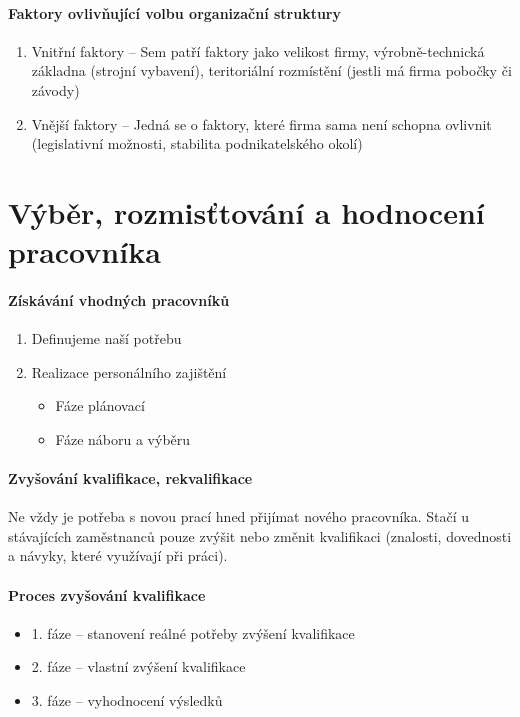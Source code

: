 \paragraph*{Faktory ovlivňující volbu organizační struktury}
\begin{enumerate}
   \item Vnitřní faktory -- Sem patří faktory jako velikost firmy, výrobně-technická základna (strojní vybavení), teritoriální rozmístění (jestli má firma pobočky či závody)
   \item Vnější faktory -- Jedná se o faktory, které firma sama není schopna ovlivnit (legislativní možnosti, stabilita podnikatelského okolí)
\end{enumerate}

\section*{Výběr, rozmisťtování a hodnocení pracovníka}

\paragraph*{Získávání vhodných pracovníků}
\begin{enumerate}
    \item Definujeme naší potřebu
    \item Realizace personálního zajištění
        \begin{itemize}
            \item Fáze plánovací
            \item Fáze náboru a výběru
        \end{itemize}
\end{enumerate}

\paragraph*{Zvyšování kvalifikace, rekvalifikace}
Ne vždy je potřeba s novou prací hned přijímat nového pracovníka. Stačí u stávajících zaměstnanců pouze zvýšit nebo změnit kvalifikaci (znalosti, dovednosti a návyky, které využívají při práci).

\paragraph*{Proces zvyšování kvalifikace}
\begin{itemize}
    \item 1. fáze -- stanovení reálné potřeby zvýšení kvalifikace
    \item 2. fáze -- vlastní zvýšení kvalifikace
    \item 3. fáze -- vyhodnocení výsledků
\end{itemize}


